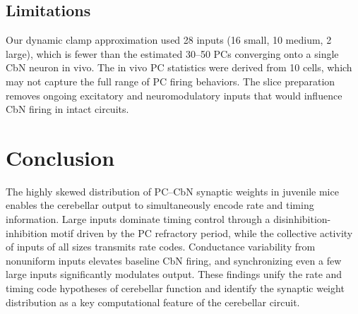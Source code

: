 \documentclass[12pt]{article}
\begin{document}
\subsection{Limitations}

Our dynamic clamp approximation used 28 inputs (16 small, 10 medium, 2 large), which is fewer than the estimated 30--50 PCs converging onto a single CbN neuron in vivo. The in vivo PC statistics were derived from 10 cells, which may not capture the full range of PC firing behaviors. The slice preparation removes ongoing excitatory and neuromodulatory inputs that would influence CbN firing in intact circuits.

\section{Conclusion}

The highly skewed distribution of PC--CbN synaptic weights in juvenile mice enables the cerebellar output to simultaneously encode rate and timing information. Large inputs dominate timing control through a disinhibition-inhibition motif driven by the PC refractory period, while the collective activity of inputs of all sizes transmits rate codes. Conductance variability from nonuniform inputs elevates baseline CbN firing, and synchronizing even a few large inputs significantly modulates output. These findings unify the rate and timing code hypotheses of cerebellar function and identify the synaptic weight distribution as a key computational feature of the cerebellar circuit.



\end{document}
